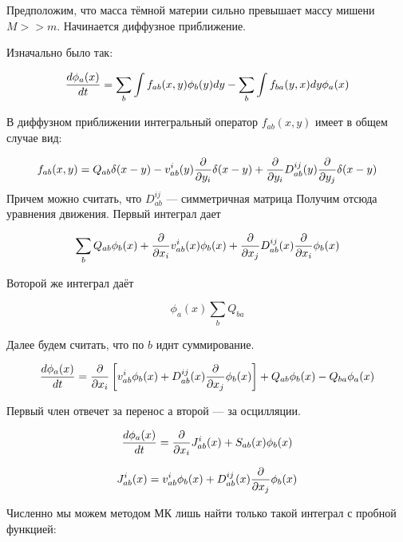 Предположим, что масса тёмной материи сильно превышает массу мишени $M >> m$. Начинается диффузное приближение.

Изначально было так:

\begin{equation*}
	\frac{d \phi_a(x)}{d t} = \sum_b\int{f_{ab}(x,y) \phi_b(y) dy} - \sum_b \int{f_{ba}(y,x)  dy} \phi_a(x)
\end{equation*}

В диффузном приближении интегральный оператор $f_{ab}(x,y)$ имеет в общем случае вид:

\begin{equation*}
	f_{ab}(x,y) = Q_{ab} \delta(x-y) -  v^i_{ab}(y)\frac{\partial }{\partial y_i} \delta(x-y) + \frac{\partial }{\partial y_i} D^{ij}_{ab}(y) \frac{\partial }{\partial y_j} \delta(x-y)
\end{equation*}
Причем можно считать, что $D^{ij}_{ab}$ --- симметричная матрица
Получим отсюда уравнения движения.
Первый интеграл дает


\begin{equation*}
	\sum_b{Q_{ab} \phi_b(x) + \frac{\partial }{\partial x_i} v^i_{ab}(x) \phi_b(x)  + \frac{\partial }{\partial x_j} D^{ij}_{ab}(x) \frac{\partial }{\partial x_i} \phi_b(x)}
\end{equation*}

Воторой же интеграл даёт 

\begin{equation*}
	\phi_a(x) \sum_b{Q_{ba}}
\end{equation*}

Далее будем считать, что по $b$ иднт суммирование.

\begin{equation*}
	\frac{d \phi_a(x)}{d t} = \frac{\partial }{\partial x_i}\left[ v^i_{ab} \phi_b(x)  + D^{ij}_{ab}(x) \frac{\partial }{\partial x_j} \phi_b(x) \right] + Q_{ab}  \phi_b(x) -Q_{ba} \phi_a(x) 
\end{equation*}

Первый член отвечет за перенос а второй --- за осцилляции.

\begin{equation*}
	\frac{d \phi_a(x)}{d t} = \frac{\partial }{\partial x_i}J^i_{ab}(x) + S_{ab}(x)\phi_b(x)
\end{equation*}

\begin{equation*}
	J^i_{ab}(x) = v^i_{ab} \phi_b(x)  + D^{ij}_{ab}(x) \frac{\partial }{\partial x_j} \phi_b(x)
\end{equation*}

Численно мы можем методом МК лишь найти только такой интеграл с пробной функцией:

